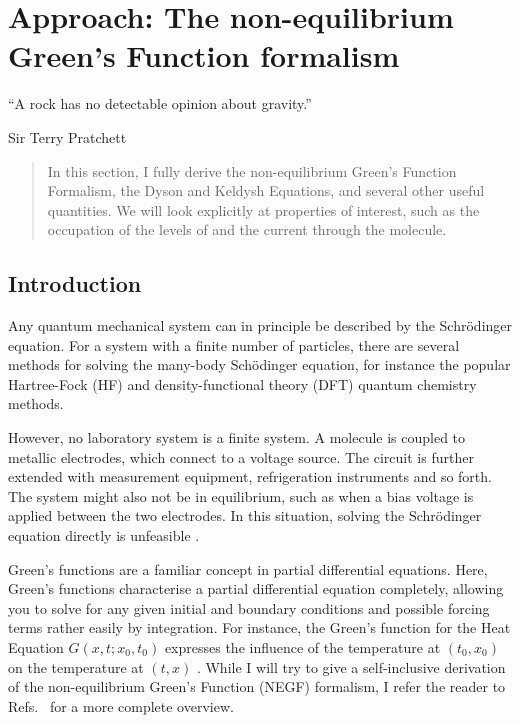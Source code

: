 \chapter{Approach: The non-equilibrium Green's Function formalism}
\label{ch:chapter_2}




\epigraph{
    “A rock has no detectable opinion about gravity.”
}{Sir Terry Pratchett}

\begin{abstract}
In this section, I fully derive the non-equilibrium Green's Function Formalism, the Dyson and Keldysh Equations, and several other useful quantities. We will look explicitly at properties of interest, such as the occupation of the levels of and the current through the molecule.
\end{abstract}

\newpage
\section{Introduction}
Any quantum mechanical system can in principle be described by the Schr\"odinger equation. For a system with a finite number of particles, there are several methods for solving the many-body Sch\"odinger equation, for instance the popular Hartree-Fock (HF) and density-functional theory (DFT) quantum chemistry methods.

However, no laboratory system is a finite system. A molecule is coupled to metallic electrodes, which connect to a voltage source. The circuit is further extended with measurement equipment, refrigeration instruments and so forth. The system might also not be in equilibrium, such as when a bias voltage is applied between the two electrodes. In this situation, solving the Schr\"odinger equation directly is unfeasible \cite{seldenthuis}.

Green's functions are a familiar concept in partial differential equations. Here, Green's functions characterise a partial differential equation completely, allowing you to solve for any given initial and boundary conditions and possible forcing terms rather easily by integration. For instance, the Green's function for the Heat Equation $G(x,t; x_0, t_0)$ expresses the influence of the temperature at $(t_0, x_0)$ on the temperature at $(t,x)$ \cite{haberman}. 
While I will try to give a self-inclusive derivation of the non-equilibrium Green's Function (NEGF) formalism, I refer the reader to Refs.~\cite{mattuck,diventra,haugjauho} for a more complete overview.

